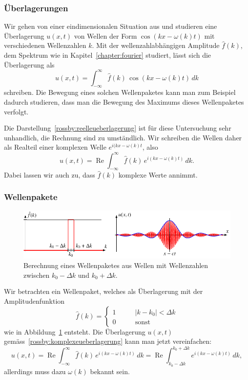 \subsubsection{Überlagerungen}
Wir gehen von einer eindimensionalen Situation aus und studieren
eine Überlagerung $u(x,t)$ von Wellen der Form $\cos(kx-\omega(k) t)$
mit verschiedenen Wellenzahlen $k$.
Mit der wellenzahlabhängigen Amplitude $\hat f(k)$, dem Spektrum
wie in Kapitel~\ref{chapter:fourier} studiert, lässt sich die
Überlagerung als
\begin{equation}
u(x,t)
=
\int_{-\infty}^\infty \hat f(k)\,\cos(kx-\omega(k)t)\,dk
\label{rossby:reelleueberlagerung}
\end{equation}
schreiben.
Die Bewegung eines solchen Wellenpaketes kann man zum Beispiel
dadurch studieren, dass man die Bewegung des Maximums dieses 
Wellenpaketes verfolgt.

Die Darstellung~\eqref{rossby:reelleueberlagerung} ist für diese
Untersuchung sehr unhandlich, die Rechnung sind zu umständlich.
Wir schreiben die Wellen daher als Realteil einer komplexen
Welle $e^{i(kx-\omega(k)t}$, also
\begin{equation}
u(x,t)
=
\operatorname{Re}
\int_{-\infty}^\infty \hat f(k)\,e^{i(kx-\omega(k)t)}\,dk.
\label{rossby:komplexeueberlagerung}
\end{equation}
Dabei lassen wir auch zu, dass $\hat{f}(k)$ komplexe Werte annimmt.

\subsubsection{Wellenpakete}
\begin{figure}
\centering
\includegraphics{chapters/7/wellenpaket.pdf}
\caption{Berechnung eines Wellenpaketes aus Wellen mit Wellenzahlen
zwischen $k_0-\Delta k$ und $k_0+\Delta k$.
\label{rossby:wellenpaket}}
\end{figure}
Wir betrachten ein Wellenpaket, welches als Überlagerung mit der
Amplitudenfunktion
\[
\hat f(k)
=
\begin{cases}
1&\qquad |k-k_0| < \Delta k\\
0&\qquad\text{sonst}
\end{cases}
\]
wie in Abbildung~\ref{rossby:wellenpaket} entsteht.
Die Überlagerung $u(x,t)$ gemäss~\eqref{rossby:komplexeueberlagerung}
kann man jetzt vereinfachen:
\[
u(x,t)
=
\operatorname{Re}
\int_{-\infty}^\infty \hat f(k)\,e^{i(kx-\omega(k)t)}\,dk
=
\operatorname{Re}
\int_{k_0-\Delta k}^{k_0+\Delta k} e^{i(kx-\omega(k)t)}\,dk,
\]
allerdings muss dazu $\omega(k)$ bekannt sein.

